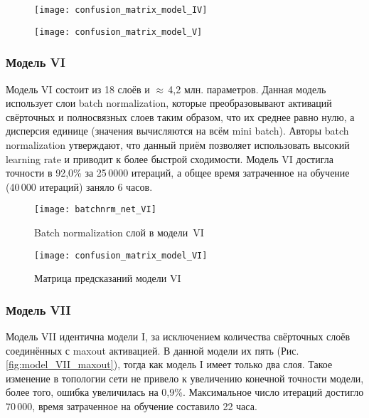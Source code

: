 \begin{figure}[H]
\centering
\begin{minipage}{.5\textwidth}
  \centering
  \texttt{[image: confusion\_matrix\_model\_IV]}
  \vspace*{-1.7cm}
\end{minipage}%
\begin{minipage}{.5\textwidth}
  \centering
  \texttt{[image: confusion\_matrix\_model\_V]}
  \vspace*{-1.7cm}
\end{minipage}
\end{figure}

\subsubsection{Модель VI}
Модель VI состоит из 18 слоёв и $\approx$\,4,2 млн. параметров. Данная модель использует слои batch normalization, 
которые преобразовывают активаций свёрточных и полносвязных слоев таким образом, что их среднее равно нулю, а
дисперсия единице (значения вычисляются на всём mini batch). Авторы batch normalization \cite{DBLP:journals/corr/IoffeS15}
утверждают, что данный приём позволяет использовать высокий learning rate и приводит к более быстрой сходимости.
Модель VI достигла точности в 92,0\% за 25\,0000 итераций, а общее время затраченное на обучение (40\,000 итераций)
заняло 6 часов.
\begin{figure}[H]
    \centering
    \texttt{[image: batchnrm\_net\_VI]}
    \caption{Batch normalization слой в модели~VI}
    \label{fig:model_VI_bnrm}
\end{figure}

\begin{figure}[H]
    \centering
    \texttt{[image: confusion\_matrix\_model\_VI]}
    \vspace*{-1cm}
    \caption{Матрица предсказаний модели VI}
    \label{fig:confusion_matrix_model_VI}
\end{figure}

\subsubsection{Модель VII}
Модель VII идентична модели I, за исключением количества свёрточных слоёв соединённых с maxout активацией. В данной модели их пять
(Рис. \ref{fig:model_VII_maxout}), тогда как модель I имеет только два слоя. Такое изменение в топологии сети не привело к 
увеличению конечной точности модели, более того, ошибка увеличилась на 0,9\%. Максимальное число итераций достигло 70\,000,
время затраченное на обучение составило 22 часа.

